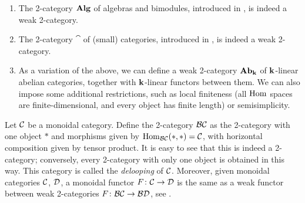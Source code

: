 \begin{example}\label{x:weak-2cat-examples}\par\noindent
  \begin{enumerate}
    \item The 2-category $\mathbf{Alg}$ of algebras and bimodules,
      introduced in , is
      indeed a weak 2-category.
    \item The 2-category $\cat$ of (small) categories,
      introduced in , is indeed a weak 2-category.
    \item As a variation of the above, we can define a weak 2-category $\mathbf{Ab}_{\mathbf{k}}$
      of $\mathbf{k}$-linear abelian categories, together with $\mathbf{k}$-linear functors
      between them. We can also impose some additional restrictions, such as
      local finiteness (all $\operatorname{Hom}$ spaces are finite-dimensional, and every
      object has finite length) or semisimplicity.
  \end{enumerate}
\end{example}
\begin{example}\label{x:BC}
  Let $\mathcal{C}$ be a monoidal category. Define the 2-category $\mathcal{B}\mathcal{C}$ as the
  2-category with one object $*$ and morphisms given by $\operatorname{Hom}_{\mathcal{B}\mathcal{C}}(*,*)
  =\mathcal{C}$, with horizontal composition given by tensor product. It is easy to
  see that this is indeed a 2-category; conversely, every 2-category with only
  one object is obtained in this way. This category is called the
  \emph{delooping} of $\mathcal{C}$. Moreover, given monoidal
  categories $\mathcal{C}$, $\mathcal{D}$, a monoidal functor $F\colon \mathcal{C}\to\mathcal{D}$ is the
  same as a weak functor between weak 2-categories $F\colon \mathcal{B}\mathcal{C}\to
  \mathcal{B}\mathcal{D}$, see \cite[Example 1.5.9]{leinster}.
\end{example}

